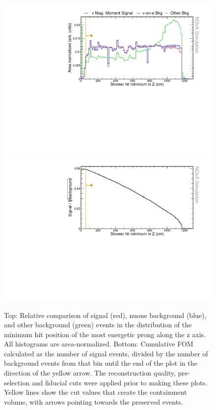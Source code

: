 \begin{figure}[hbtp]
\centering
\includegraphics[width=.9\textwidth]{Plots/NuMMEventSelection/N1Cut_minZ.pdf}
\includegraphics[width=.9\textwidth]{Plots/NuMMEventSelection/NuMM_N1Cut_minZright_FOMStats.pdf}
\caption[Hit minimum z containment cut]{Top: Relative comparison of signal (red), \acrshort{nuone} background (blue), and other background (green) events in the distribution of the minimum hit position of the most energetic prong along the z axis. All histograms are area-normalized. Bottom: Cumulative \acrshort{FOM} calculated as the number of signal events, divided by the number of background events from that bin until the end of the plot in the direction of the yellow arrow. The reconstruction quality, pre-selection and fiducial cuts were applied prior to making these plots. Yellow lines show the cut values that create the containment volume, with arrows pointing towards the preserved events.}
\label{fig:NuMMContainmentCutMinZ}
\end{figure}

